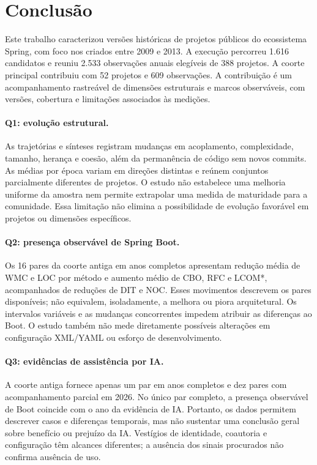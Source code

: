 \section{Conclusão}
\label{sec:conclusao}

Este trabalho caracterizou versões históricas de projetos públicos do ecossistema Spring, com foco nos criados entre 2009 e 2013. A execução percorreu 1.616 candidatos e reuniu 2.533 observações anuais elegíveis de 388 projetos. A coorte principal contribuiu com 52 projetos e 609 observações. A contribuição é um acompanhamento rastreável de dimensões estruturais e marcos observáveis, com versões, cobertura e limitações associados às medições.

\paragraph{Q1: evolução estrutural.}
As trajetórias e sínteses registram mudanças em acoplamento, complexidade, tamanho, herança e coesão, além da permanência de código sem novos commits. As médias por época variam em direções distintas e reúnem conjuntos parcialmente diferentes de projetos. O estudo não estabelece uma melhoria uniforme da amostra nem permite extrapolar uma medida de maturidade para a comunidade. Essa limitação não elimina a possibilidade de evolução favorável em projetos ou dimensões específicos.

\paragraph{Q2: presença observável de Spring Boot.}
Os 16 pares da coorte antiga em anos completos apresentam redução média de WMC e LOC por método e aumento médio de CBO, RFC e LCOM*, acompanhados de reduções de DIT e NOC. Esses movimentos descrevem os pares disponíveis; não equivalem, isoladamente, a melhora ou piora arquitetural. Os intervalos variáveis e as mudanças concorrentes impedem atribuir as diferenças ao Boot. O estudo também não mede diretamente possíveis alterações em configuração XML/YAML ou esforço de desenvolvimento.

\paragraph{Q3: evidências de assistência por IA.}
A coorte antiga fornece apenas um par em anos completos e dez pares com acompanhamento parcial em 2026. No único par completo, a presença observável de Boot coincide com o ano da evidência de IA. Portanto, os dados permitem descrever casos e diferenças temporais, mas não sustentar uma conclusão geral sobre benefício ou prejuízo da IA. Vestígios de identidade, coautoria e configuração têm alcances diferentes; a ausência dos sinais procurados não confirma ausência de uso.

